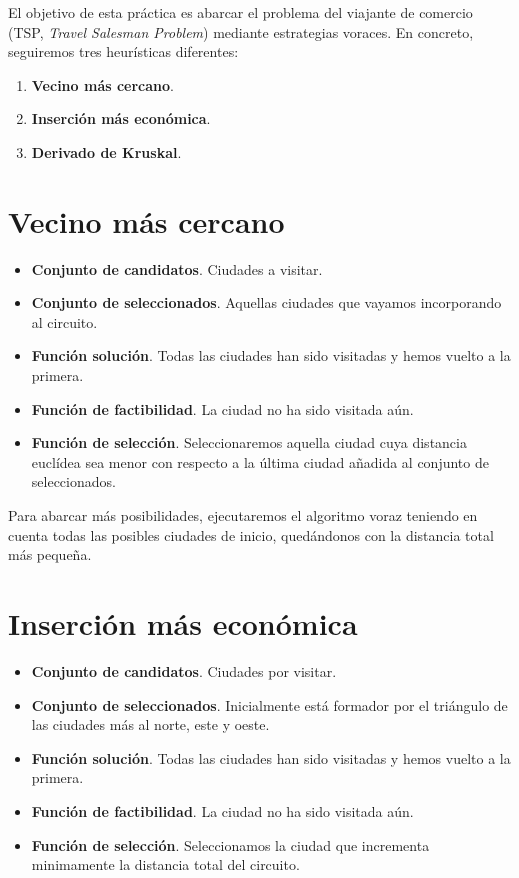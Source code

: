 \documentclass[12pt,spanish]{article}
\begin{document}
El objetivo de esta práctica es abarcar el problema del viajante de comercio (TSP, \textit{Travel Salesman Problem}) mediante estrategias voraces. En concreto, seguiremos tres heurísticas diferentes:

\begin{enumerate}
	\item \textbf{Vecino más cercano}.
	\item \textbf{Inserción más económica}.
	\item \textbf{Derivado de Kruskal}.
\end{enumerate}

\section{Vecino más cercano}

\begin{itemize}
	\item \textbf{Conjunto de candidatos}. Ciudades a visitar.
	\item \textbf{Conjunto de seleccionados}. Aquellas ciudades que vayamos incorporando al circuito.
	\item \textbf{Función solución}. Todas las ciudades han sido visitadas y hemos vuelto a la primera.
	\item \textbf{Función de factibilidad}. La ciudad no ha sido visitada aún.
	\item \textbf{Función de selección}. Seleccionaremos aquella ciudad cuya distancia euclídea sea menor con respecto a la última ciudad añadida al conjunto de seleccionados.
\end{itemize}

Para abarcar más posibilidades, ejecutaremos el algoritmo voraz teniendo en cuenta todas las posibles ciudades de inicio, quedándonos con la distancia total más pequeña.

\section{Inserción más económica}

\begin{itemize}
	\item \textbf{Conjunto de candidatos}. Ciudades por visitar.
	\item \textbf{Conjunto de seleccionados}. Inicialmente está formador por el triángulo de las ciudades más al norte, este y oeste. 
	\item \textbf{Función solución}. Todas las ciudades han sido visitadas y hemos vuelto a la primera. 
	\item \textbf{Función de factibilidad}. La ciudad no ha sido visitada aún.
	\item \textbf{Función de selección}. Seleccionamos la ciudad que incrementa minimamente la distancia total del circuito.
\end{itemize}
\end{document}
